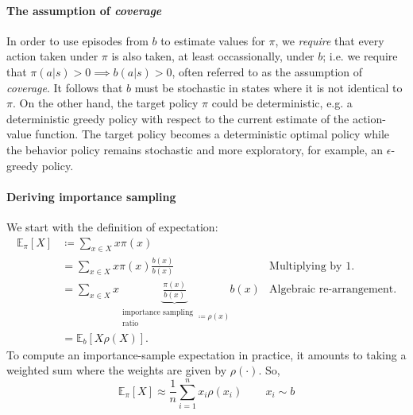 \documentclass[12pt]{article}
\begin{document}
\paragraph{The assumption of \emph{coverage}}
In order to use episodes from $b$ to estimate values for $\pi$, we \emph{require} that every action taken under $\pi$ is also taken, at least occassionally, under $b$; i.e. we require that $\pi(a|s) > 0 \implies b(a|s) > 0$, often referred to as the assumption of \emph{coverage}. It follows that $b$ must be stochastic in states where it is not identical to $\pi$. On the other hand, the target policy $\pi$ could be deterministic, e.g. a deterministic greedy policy with respect to the current estimate of the action-value function. The target policy becomes a deterministic optimal policy while the behavior policy remains stochastic and more exploratory, for example, an $\epsilon$-greedy policy.

\paragraph{Deriving importance sampling}
We start with the definition of expectation:
\begin{align*}
  \mathbb E_\pi \left[X\right] &\coloneqq \sum_{x \in X} x \pi(x) \\
                               &= \sum_{x \in X} x \pi(x) \frac{b(x)}{b(x)} &\textrm{Multiplying by 1.}\\
                               &= \sum_{x \in X} x \underbrace{\frac{\pi(x)}{b(x)}}_{\substack{\textrm{importance sampling} \\     \textrm{ratio}} \coloneqq \rho(x)} b(x) &\textrm{Algebraic re-arrangement.}\\
  &= \mathbb E_b \left[X \rho(X)\right].
\end{align*}
To compute an importance-sample expectation in practice, it amounts to taking a weighted sum where the weights are given by $\rho(\cdot)$. So,
\[
  \mathbb E_\pi\left[X\right] \approx \frac{1}{n} \sum_{i=1}^n x_i \rho(x_i) \hspace{25pt} x_i \sim b
\]
\end{document}
